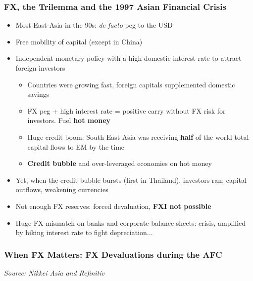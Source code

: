 \documentclass{beamer}
\begin{document}
\begin{frame}
  \frametitle{FX, the Trilemma and the 1997 Asian Financial Crisis}

  \begin{itemize}
    \item Most East-Asia in the 90s: \emph{de facto} peg to the USD
    \item Free mobility of capital (except in China)
    \item Independent monetary policy with a high domestic interest rate to attract foreign investors
      \begin{itemize}
      \item Countries were growing fast, foreign capitals supplemented domestic savings
      \item FX peg + high interest rate = positive carry without FX risk for investors. Fuel \textbf{hot money}
      \item Huge credit boom: South-East Asia was receiving \textbf{half} of the world total capital flows to EM by the time
      \item \textbf{Credit bubble} and over-leveraged economies on hot money
      \end{itemize}
    \item Yet, when the credit bubble bursts (first in Thailand), investors ran: capital outflows, weakening currencies
    \item Not enough FX reserves: forced devaluation, \textbf{FXI not possible}
    \item Huge FX mismatch on banks and corporate balance sheets: crisis, amplified by hiking interest rate to fight depreciation...
  \end{itemize}
    
\end{frame}


\begin{frame}
\frametitle{When FX Matters: FX Devaluations during the AFC}
\medskip
\emph{Source: Nikkei Asia and Refinitiv}
\end{frame}
\end{document}
